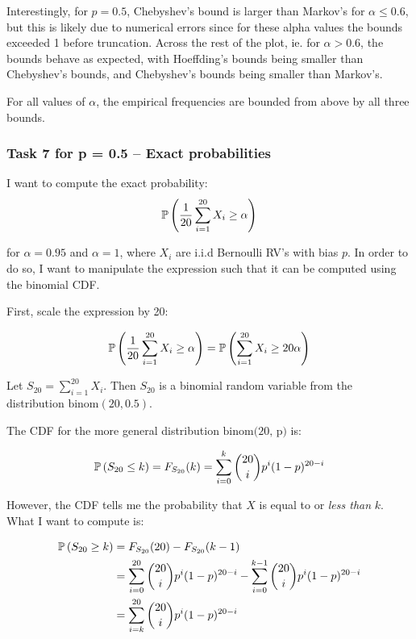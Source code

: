 Interestingly, for $p = 0.5$, Chebyshev's bound is larger than Markov's for
$\alpha \leq 0.6$, but this is likely due to numerical errors since for these
alpha values the bounds exceeded 1 before truncation. Across the rest of the
plot, ie. for $\alpha > 0.6$, the bounds behave as expected, with Hoeffding's
bounds being smaller than Chebyshev's bounds, and Chebyshev's bounds being
smaller than Markov's. 

For all values of $\alpha$, the empirical frequencies are bounded from above by
all three bounds.

\subsubsection{Task 7 for p = 0.5 -- Exact probabilities}
\label{sec:exact_probs}

I want to compute the exact probability:
\begin{align*}
  \mathbb P \left(\frac{1}{20} \sum_{i = 1}^{20} X_i \geq \alpha\right)
\end{align*}

\noindent for $\alpha = 0.95$ and $\alpha = 1$, where $X_i$ are i.i.d Bernoulli
RV's with bias $p$. In order to do so, I want to manipulate the expression such that it can be
computed using the binomial CDF.

First, scale the expression by 20:

\begin{align*}
  \mathbb P \left(\frac{1}{20} \sum_{i = 1}^{20} X_i \geq \alpha\right) = \mathbb P \left(\sum_{i = 1}^{20}
  X_i \geq 20 \alpha\right)
\end{align*}

Let $S_{20} = \textstyle \sum_{i = 1}^{20}X_i$. Then $S_{20}$ is a binomial
random variable from the distribution $\text{binom}(20, 0.5)$.

The CDF for the more general distribution $\text{binom(20, p)}$ is:

\begin{align*}
  \mathbb P \left(S_{20} \leq k\right) = F_{S_{20}}(k) = \sum_{i = 0}^{k} \binom{20}{i} p^i(1 - p)^{20 - i}
\end{align*}

\noindent However, the CDF tells me the probability that $X$ is equal to or
\textit{less than} $k$. What I want to compute is:

\begin{align}
  \mathbb P \left(S_{20} \geq k\right) &= F_{S_{20}}(20) - F_{S_{20}}(k - 1)\nonumber\\
                &= \sum_{i = 0}^{20} \binom{20}{i} p^i(1 - p)^{20 - i} - \sum_{i
                = 0}^{k - 1} \binom{20}{i} p^i(1 - p)^{20 - i}\nonumber\\
                &= \sum_{i = k}^{20} \binom{20}{i} p^i(1 - p)^{20 - i}\label{eq:binomatleastk}
\end{align}


